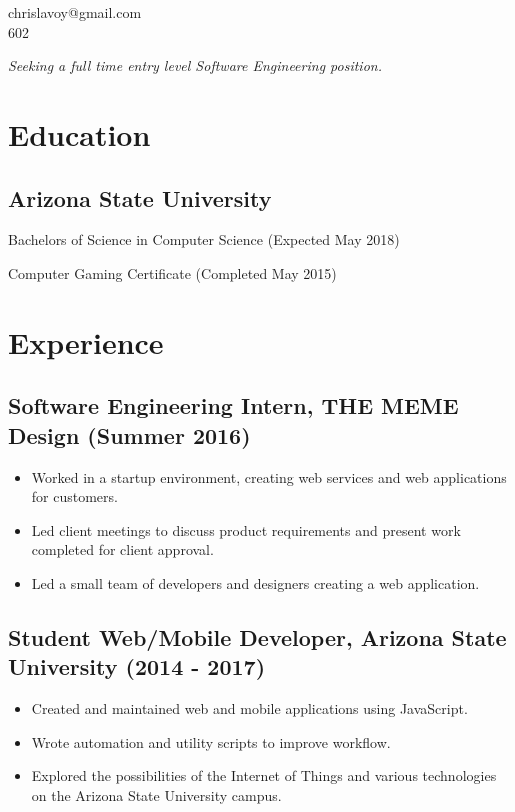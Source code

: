 \documentclass[letterpaper, 10pt]{article}
\makeatletter
\renewcommand{\maketitle}
{\begin{center}
{\Large\bfseries\MakeUppercase\theauthor}

chrislavoy@gmail.com\\
602\--999\--2734
\end{center}
}
\makeatother
\begin{document}
\author{Chris LaVoy}

\maketitle

\vspace{-1.5em}
\begin{center}
\em Seeking a full time entry level Software Engineering position.
\end{center}

\vspace{-2em}

\section{Education}

\subsection{Arizona State University}

Bachelors of Science in Computer Science (Expected May 2018)

Computer Gaming Certificate (Completed May 2015)

\vspace{-0.5em}
\section{Experience}

\subsection{Software Engineering Intern, THE MEME Design (Summer 2016)}
\begin{itemize}
\setlength\itemsep{-0.25em}
\item Worked in a startup environment, creating web services and web applications for customers.
\item Led client meetings to discuss product requirements and present work completed for client approval.
\item Led a small team of developers and designers creating a web application.
\end{itemize}

\subsection{Student Web/Mobile Developer, Arizona State University (2014 \-- 2017)}
\begin{itemize}
\setlength\itemsep{-0.25em}
\item Created and maintained web and mobile applications using JavaScript.
\item Wrote automation and utility scripts to improve workflow.
\item Explored the possibilities of the Internet of Things and various technologies on the Arizona State University campus.
\end{itemize}
\end{document}
